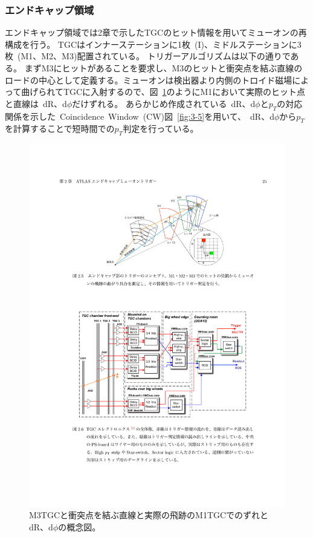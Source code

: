 \subsubsection{エンドキャップ領域}
エンドキャップ領域では2章で示したTGCのヒット情報を用いてミューオンの再構成を行う。
TGCはインナーステーションに1枚~(I)、ミドルステーションに3枚~(M1、M2、M3)配置されている。
トリガーアルゴリズムは以下の通りである。
まずM3にヒットがあることを要求し、M3のヒットと衝突点を結ぶ直線のロードの中心として定義する。ミューオンは検出器より内側のトロイド磁場によって曲げられてTGCに入射するので、図~\ref{fig:3-4}のようにM1において実際のヒット点と直線は~dR、d$\phi$だけずれる。
あらかじめ作成されている~dR、d$\phi$と$p_T$の対応関係を示した~Coincidence~Window~(CW)図~\ref{fig:3-5}を用いて、~dR、d$\phi$から$p_T$を計算することで短時間での$p_T$判定を行っている。

\begin{figure}[h]
  \centering
  \includegraphics[clip, width=12cm]{fig/3/akatsuka_mt_trigger_scheme.pdf}
  \caption{M3TGCと衝突点を結ぶ直線と実際の飛跡のM1TGCでのずれとdR、d$\phi$の概念図\cite{article:akatsuka}。}
  \label{fig:3-4}
\end{figure}

